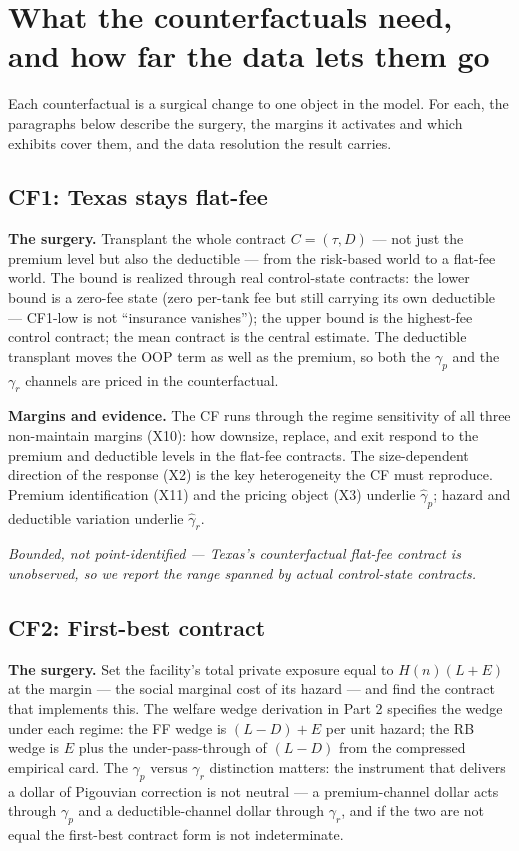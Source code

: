\documentclass[
  letterpaper,
  DIV=11,
  numbers=noendperiod]{scrartcl}
\begin{document}
\newpage

\section{What the counterfactuals need, and how far the data lets them
go}\label{what-the-counterfactuals-need-and-how-far-the-data-lets-them-go}

Each counterfactual is a surgical change to one object in the model. For
each, the paragraphs below describe the surgery, the margins it
activates and which exhibits cover them, and the data resolution the
result carries.

\subsection{CF1: Texas stays flat-fee}\label{cf1-texas-stays-flat-fee}

\textbf{The surgery.} Transplant the whole contract \(C = (\tau, D)\)
--- not just the premium level but also the deductible --- from the
risk-based world to a flat-fee world. The bound is realized through real
control-state contracts: the lower bound is a zero-fee state (zero
per-tank fee but still carrying its own deductible --- CF1-low is not
``insurance vanishes''); the upper bound is the highest-fee control
contract; the mean contract is the central estimate. The deductible
transplant moves the OOP term as well as the premium, so both the
\(\gamma_p\) and the \(\gamma_r\) channels are priced in the
counterfactual.

\textbf{Margins and evidence.} The CF runs through the regime
sensitivity of all three non-maintain margins (X10): how downsize,
replace, and exit respond to the premium and deductible levels in the
flat-fee contracts. The size-dependent direction of the response (X2) is
the key heterogeneity the CF must reproduce. Premium identification
(X11) and the pricing object (X3) underlie \(\hat\gamma_p\); hazard and
deductible variation underlie \(\hat\gamma_r\).

\emph{Bounded, not point-identified --- Texas's counterfactual flat-fee
contract is unobserved, so we report the range spanned by actual
control-state contracts.}

\subsection{CF2: First-best contract}\label{cf2-first-best-contract}

\textbf{The surgery.} Set the facility's total private exposure equal to
\(H(n)(L + E)\) at the margin --- the social marginal cost of its hazard
--- and find the contract that implements this. The welfare wedge
derivation in Part 2 specifies the wedge under each regime: the FF wedge
is \((L-D) + E\) per unit hazard; the RB wedge is \(E\) plus the
under-pass-through of \((L-D)\) from the compressed empirical card. The
\(\gamma_p\) versus \(\gamma_r\) distinction matters: the instrument
that delivers a dollar of Pigouvian correction is not neutral --- a
premium-channel dollar acts through \(\gamma_p\) and a
deductible-channel dollar through \(\gamma_r\), and if the two are not
equal the first-best contract form is not indeterminate.
\end{document}
